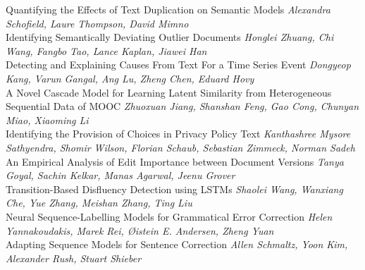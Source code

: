 \documentclass{book}
\begin{document}
    \noindent	Quantifying the Effects of Text Duplication on Semantic Models \newline 
    {\itshape Alexandra Schofield, Laure Thompson, David Mimno} \\
    
    \noindent	Identifying Semantically Deviating Outlier Documents \newline 
    {\itshape Honglei Zhuang, Chi Wang, Fangbo Tao, Lance Kaplan, Jiawei Han} \\
    
    \noindent	Detecting and Explaining Causes From Text For a Time Series Event \newline 
    {\itshape Dongyeop Kang, Varun Gangal, Ang Lu, Zheng Chen, Eduard Hovy} \\
    
    \noindent	A Novel Cascade Model for Learning Latent Similarity from Heterogeneous Sequential Data of MOOC \newline 
    {\itshape Zhuoxuan Jiang, Shanshan Feng, Gao Cong, Chunyan Miao, Xiaoming Li} \\
    
    \noindent	Identifying the Provision of Choices in Privacy Policy Text \newline 
    {\itshape Kanthashree Mysore Sathyendra, Shomir Wilson, Florian Schaub, Sebastian Zimmeck, Norman Sadeh} \\
    
    \noindent	An Empirical Analysis of Edit Importance between Document Versions \newline 
    {\itshape Tanya Goyal, Sachin Kelkar, Manas Agarwal, Jeenu Grover} \\
    
    \noindent	Transition-Based Disfluency Detection using LSTMs \newline 
    {\itshape Shaolei Wang, Wanxiang Che, Yue Zhang, Meishan Zhang, Ting Liu} \\
    
    \noindent	Neural Sequence-Labelling Models for Grammatical Error Correction \newline 
    {\itshape Helen Yannakoudakis, Marek Rei, Øistein E. Andersen, Zheng Yuan} \\
    
    \noindent	Adapting Sequence Models for Sentence Correction \newline 
    {\itshape Allen Schmaltz, Yoon Kim, Alexander Rush, Stuart Shieber} \\
    
\vspace*{\fill}
\end{document}
